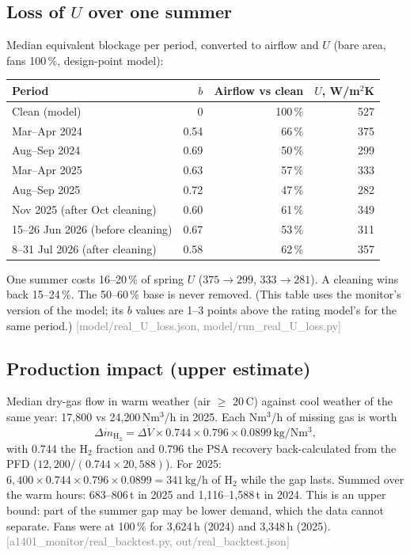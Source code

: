 \documentclass[11pt,a4paper]{article}
\newcommand{\unit}[1]{\ensuremath{\,\mathrm{#1}}}
\newcommand{\src}[1]{\textcolor{gray}{\small[#1]}}
\begin{document}
\subsection*{Loss of $U$ over one summer}
Median equivalent blockage per period, converted to airflow and $U$ (bare area, fans 100\,\%, design-point model):
\begin{center}\small\setlength{\tabcolsep}{4pt}\begin{tabular}{lrrr}
\toprule
Period & $b$ & Airflow vs clean & $U$, W/m$^2$K\\\midrule
Clean (model) & 0 & 100\,\% & 527\\
Mar--Apr 2024 & 0.54 & 66\,\% & 375\\
Aug--Sep 2024 & 0.69 & 50\,\% & 299\\
Mar--Apr 2025 & 0.63 & 57\,\% & 333\\
Aug--Sep 2025 & 0.72 & 47\,\% & 282\\
Nov 2025 (after Oct cleaning) & 0.60 & 61\,\% & 349\\
15--26 Jun 2026 (before cleaning) & 0.67 & 53\,\% & 311\\
8--31 Jul 2026 (after cleaning) & 0.58 & 62\,\% & 357\\
\bottomrule\end{tabular}\end{center}
One summer costs 16--20\,\% of spring $U$ ($375\to299$, $333\to281$). A cleaning wins back 15--24\,\%. The 50--60\,\% base is never removed. (This table uses the monitor's version of the model; its $b$ values are 1--3 points above the rating model's for the same period.)
\src{model/real\_U\_loss.json, model/run\_real\_U\_loss.py}

\subsection*{Production impact (upper estimate)}
Median dry-gas flow in warm weather (air $\ge$ 20\,\textdegree C) against cool weather of the same year: 17{,}800 vs 24{,}200\,Nm$^3$/h in 2025. Each Nm$^3$/h of missing gas is worth
\[
\Delta\dot m_{\mathrm{H_2}} = \Delta\dot V \times 0.744 \times 0.796 \times 0.0899\unit{kg/Nm^3},
\]
with 0.744 the H$_2$ fraction and 0.796 the PSA recovery back-calculated from the PFD ($12{,}200 / (0.744\times20{,}588)$). For 2025: $6{,}400\times0.744\times0.796\times0.0899 = 341\unit{kg/h}$ of H$_2$ while the gap lasts. Summed over the warm hours: 683--806\,t in 2025 and 1{,}116--1{,}588\,t in 2024. This is an upper bound: part of the summer gap may be lower demand, which the data cannot separate. Fans were at 100\,\% for 3{,}624\,h (2024) and 3{,}348\,h (2025).
\src{a1401\_monitor/real\_backtest.py, out/real\_backtest.json}
\end{document}
